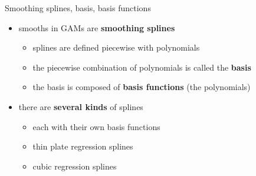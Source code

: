 \documentclass[ignorenonframetext,]{beamer}
\providecommand{\tightlist}{%
  \setlength{\itemsep}{0pt}\setlength{\parskip}{0pt}}
\begin{document}
\begin{frame}{Smoothing splines, basis, basis functions}
\protect\hypertarget{smoothing-splines-basis-basis-functions}{}

\begin{itemize}
\tightlist
\item
  smooths in GAMs are \textbf{smoothing splines}

  \begin{itemize}
  \tightlist
  \item
    splines are defined piecewise with polynomials
  \item
    the piecewise combination of polynomials is called the
    \textbf{basis}
  \item
    the basis is composed of \textbf{basis functions} (the polynomials)
  \end{itemize}
\item
  there are \textbf{several kinds} of splines

  \begin{itemize}
  \tightlist
  \item
    each with their own basis functions
  \item
    thin plate regression splines
  \item
    cubic regression splines
  \end{itemize}
\end{itemize}

\end{frame}
\end{document}
